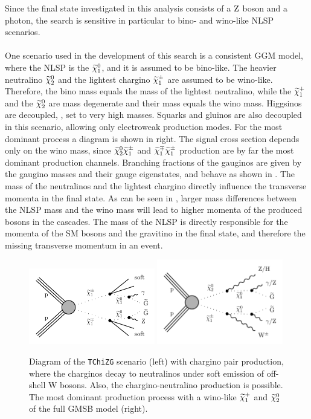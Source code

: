 Since the final state investigated in this analysis consists of a $\mathrm{Z}$ boson and a photon, the search is sensitive in particular to bino- and wino-like NLSP scenarios.\\\\
One scenario used in the development of this search is a consistent GGM model, where the NLSP is the $\widetilde{\chi}^{0}_{1}$, and it is assumed to be bino-like. The heavier neutralino $\widetilde{\chi}^{0}_{2}$ and the lightest chargino $\widetilde{\chi}^\pm_{1}$ are assumed to be wino-like. Therefore, the bino mass equals the mass of the lightest neutralino, while the $\widetilde{\chi}^{+}_{1}$ and the $\widetilde{\chi}^{0}_{2}$ are mass degenerate and their mass equals the wino mass. Higgsinos are decoupled, \ie, set to very high masses. Squarks and gluinos are also decoupled in this scenario, allowing only electroweak production modes. For the most dominant process a diagram is shown in  right. The signal cross section depends only on the wino mass, since $\widetilde{\chi}^{0}_{2}\widetilde{\chi}^\pm_{1}$ and $\widetilde{\chi}^\mp_{1}\widetilde{\chi}^\pm_{1}$ production are by far the most dominant production channels. Branching fractions of the gauginos are given by the gaugino masses and their gauge eigenstates, and behave as shown in . The mass of the neutralinos and the lightest chargino directly influence the transverse momenta in the final state. As can be seen in , larger mass differences between the NLSP mass and the wino mass will lead to higher momenta of the produced bosons in the cascades. The mass of the NLSP is directly responsible for the momenta of the SM bosons and the gravitino in the final state, and therefore the missing transverse momentum in an event.
\begin{figure}[tbp]
 \centering
 \includegraphics[width=0.49\textwidth]{figures/signal/TChiNG}
 \includegraphics[width=0.49\textwidth]{figures/signal/gmsb}
 \caption{Diagram of the \texttt{TChiZG} scenario (left) with chargino pair production, where the charginos decay to neutralinos under soft emission of off-shell W bosons. Also, the chargino-neutralino production is possible. The most dominant production process with a wino-like $\widetilde{\chi}^{+}_{1}$ and $\widetilde{\chi}^{0}_{2}$ of the full GMSB model (right).}
 \label{fig:ewkSMS}
\end{figure}

